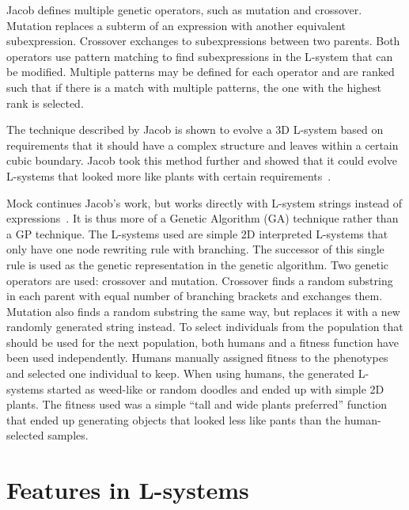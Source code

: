 Jacob defines multiple genetic operators, such as mutation and crossover.
Mutation replaces a subterm of an expression with another equivalent subexpression.
Crossover exchanges to subexpressions between two parents.
Both operators use pattern matching to find subexpressions in the L-system that can be modified.
Multiple patterns may be defined for each operator and are ranked such that if there is a match with multiple patterns, the one with the highest rank is selected.

The technique described by Jacob is shown to evolve a 3D L-system based on requirements that it should have a complex structure and leaves within a certain cubic boundary.
Jacob took this method further and showed that it could evolve L-systems that looked more like plants with certain requirements~\cite{Jacob1995,Jacob1996,Jacob1996-2}.

Mock continues Jacob's work, but works directly with L-system strings instead of expressions~\cite{Mock1998}.
It is thus more of a Genetic Algorithm (GA) technique rather than a GP technique.
The L-systems used are simple 2D interpreted L-systems that only have one node rewriting rule with branching.
The successor of this single rule is used as the genetic representation in the genetic algorithm.
Two genetic operators are used: crossover and mutation.
Crossover finds a random substring in each parent with equal number of branching brackets and exchanges them.
Mutation also finds a random substring the same way, but replaces it with a new randomly generated string instead.
To select individuals from the population that should be used for the next population, both humans and a fitness function have been used independently.
Humans manually assigned fitness to the phenotypes and selected one individual to keep.
When using humans, the generated L-systems started as weed-like or random doodles and ended up with simple 2D plants.
The fitness used was a simple ``tall and wide plants preferred'' function that ended up generating objects that looked less like pants than the human-selected samples.

\section{Features in L-systems}

